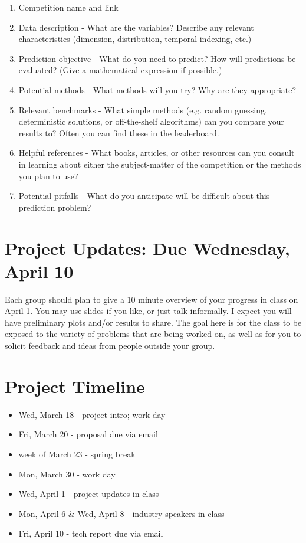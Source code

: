 \documentclass[11pt, oneside]{article}   	%
\begin{document}
\begin{enumerate}
\item Competition name and link
\item Data description - What are the variables? Describe any relevant characteristics (dimension, distribution, temporal indexing, etc.)
\item Prediction objective - What do you need to predict? How will predictions be evaluated? (Give a mathematical expression if possible.)
\item Potential methods - What methods will you try? Why are they appropriate?
\item Relevant benchmarks - What simple methods (e.g. random guessing, deterministic solutions, or off-the-shelf algorithms) can you compare your results to? Often you can find these in the leaderboard.
\item Helpful references - What books, articles, or other resources can you consult in learning about either the subject-matter of the competition or the methods you plan to use?
\item Potential pitfalls - What do you anticipate will be difficult about this prediction problem?
\end{enumerate}

\section{Project Updates: Due Wednesday, April 10}

Each group should plan to give a 10 minute overview of your progress in class on April 1. You may use slides if you like, or just talk informally. I expect you will have preliminary plots and/or results to share. The goal here is for the class to be exposed to the variety of problems that are being worked on, as well as for you to solicit feedback and ideas from people outside your group.

\section{Project Timeline}

\begin{itemize}
\item Wed, March 18 - project intro; work day
\item Fri, March 20 - proposal due via email
\item week of March 23 - spring break
\item Mon, March 30 - work day
\item Wed, April 1 - project updates in class
\item Mon, April 6 \& Wed, April 8 - industry speakers in class
\item Fri, April 10 - tech report due via email
\end{itemize}
\end{document}
